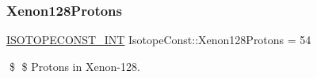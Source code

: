 \subsubsection{\texorpdfstring{Xenon128\+Protons}{Xenon128Protons}}
{\footnotesize\ttfamily \mbox{\hyperlink{group___isotope_const-_macros_ga5f18360b3e99483a35c32d789e62621c}{I\+S\+O\+T\+O\+P\+E\+C\+O\+N\+S\+T\+\_\+\+I\+NT}} Isotope\+Const\+::\+Xenon128\+Protons = 54}

\$ \$ Protons in Xenon-\/128. 
